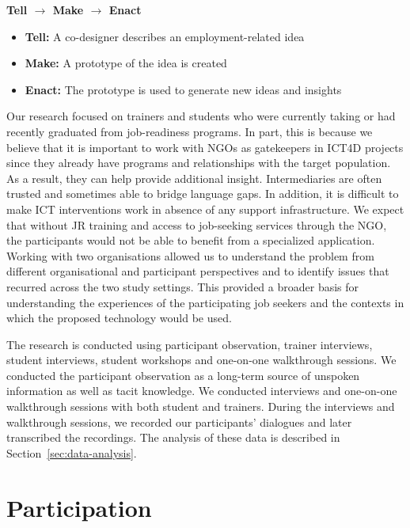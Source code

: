\bigskip

\textbf{Tell $\rightarrow$ Make $\rightarrow$ Enact}

\begin{itemize}
    \item \textbf{Tell:} A co-designer describes an employment-related idea
    \item \textbf{Make:} A prototype of the idea is created
    \item \textbf{Enact:} The prototype is used to generate new ideas and insights
\end{itemize}

\bigskip

Our research focused on trainers and students who were currently taking or had recently graduated from job-readiness programs. In part, this is because we believe that it is important to work with NGOs as gatekeepers in ICT4D projects since they already have programs and relationships with the target population. As a result, they can help provide additional insight. Intermediaries are often trusted and sometimes able to bridge language gaps. In addition, it is difficult to make ICT interventions work in absence of any support infrastructure. We expect that without JR training and access to job-seeking services through the NGO, the participants would not be able to benefit from a specialized application. Working with two organisations allowed us to understand the problem from different organisational and participant perspectives and to identify issues that recurred across the two study settings. This provided a broader basis for understanding the experiences of the participating job seekers and the contexts in which the proposed technology would be used.

The research is conducted using participant observation, trainer interviews, student interviews, student workshops and one-on-one walkthrough sessions. We conducted the participant observation as a long-term source of unspoken information as well as tacit knowledge. We conducted interviews and one-on-one walkthrough sessions with both student and trainers. During the interviews and walkthrough sessions, we recorded our participants’ dialogues and later transcribed the recordings. The analysis of these data is described in Section~\ref{sec:data-analysis}.

\section{Participation}

